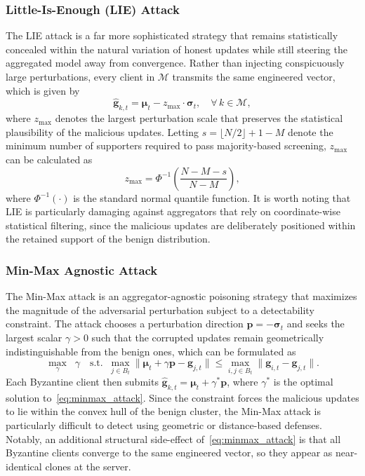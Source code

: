 \documentclass[journal]{IEEEtran}
\begin{document}
\subsubsection{Little-Is-Enough (LIE) Attack~\cite{baruch2019little}}
The LIE attack is a far more sophisticated strategy that remains statistically concealed within the natural variation of honest updates while still steering the aggregated model away from convergence. Rather than injecting conspicuously large perturbations, every client in $\mathcal{M}$ transmits the same engineered vector, which is given by
\begin{equation}
\hat{\mathbf{g}}_{k,t} = \boldsymbol{\mu}_t - z_{\max} \cdot \boldsymbol{\sigma}_t, \quad \forall\, k \in \mathcal{M},
\label{eq:lie_attack}
\end{equation}
where $z_{\max}$ denotes the largest perturbation scale that preserves the statistical plausibility of the malicious updates. Letting $s = \lfloor N/2 \rfloor + 1 - M$ denote the minimum number of supporters required to pass majority-based screening, $z_{\max}$ can be calculated as
\begin{equation}
z_{\max} = \Phi^{-1}\!\left(\frac{N - M - s}{N - M}\right),
\label{eq:zmax}
\end{equation}
where $\Phi^{-1}(\cdot)$ is the standard normal quantile function. It is worth noting that LIE is particularly damaging against aggregators that rely on coordinate-wise statistical filtering, since the malicious updates are deliberately positioned within the retained support of the benign distribution.

\subsubsection{Min-Max Agnostic Attack~\cite{shejwalkar2021manipulating}}
The Min-Max attack is an aggregator-agnostic poisoning strategy that maximizes the magnitude of the adversarial perturbation subject to a detectability constraint. The attack chooses a perturbation direction $\mathbf{p} = -\boldsymbol{\sigma}_t$ and seeks the largest scalar $\gamma > 0$ such that the corrupted updates remain geometrically indistinguishable from the benign ones, which can be formulated as
\begin{equation}
\max_{\gamma} \;\; \gamma \quad \text{s.t.} \;\; \max_{j \in B_t} \|\boldsymbol{\mu}_t + \gamma \mathbf{p} - \mathbf{g}_{j,t}\| \leq \max_{i,j \in B_t} \|\mathbf{g}_{i,t} - \mathbf{g}_{j,t}\|.
\label{eq:minmax_attack}
\end{equation}
Each Byzantine client then submits $\hat{\mathbf{g}}_{k,t} = \boldsymbol{\mu}_t + \gamma^* \mathbf{p}$, where $\gamma^*$ is the optimal solution to~\eqref{eq:minmax_attack}. Since the constraint forces the malicious updates to lie within the convex hull of the benign cluster, the Min-Max attack is particularly difficult to detect using geometric or distance-based defenses. Notably, an additional structural side-effect of~\eqref{eq:minmax_attack} is that all Byzantine clients converge to the same engineered vector, so they appear as near-identical clones at the server.
\end{document}
